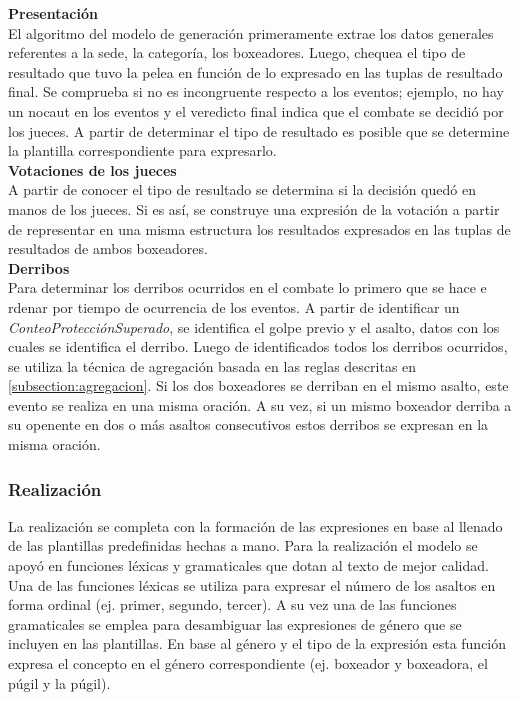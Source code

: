     \textbf{Presentación}\\

    El algoritmo del modelo de generación primeramente extrae los datos generales referentes a la sede, la categoría, los 
boxeadores. Luego, chequea el tipo de resultado que tuvo la pelea en función de lo expresado en las tuplas de resultado final.
Se comprueba si no es incongruente respecto a los eventos; ejemplo, no hay un nocaut en los eventos y el veredicto final indica que el 
combate se decidió por los jueces. A partir de determinar el tipo de resultado es posible que se determine la plantilla correspondiente para 
expresarlo.\\

    \textbf{Votaciones de los jueces}\\

    A partir de conocer el tipo de resultado se determina si la decisión quedó en manos de los jueces. Si es así, se construye una expresión 
de la votación a partir de representar en una misma estructura los resultados expresados en las tuplas de resultados de 
ambos boxeadores.\\

    \textbf{Derribos}\\

    Para determinar los derribos ocurridos en el combate lo primero que se hace e rdenar por tiempo de 
ocurrencia de los eventos. A partir de identificar un \textit{ConteoProtecciónSuperado}, se identifica el golpe previo y el asalto, 
datos con los cuales se identifica el derribo. Luego de identificados todos los derribos ocurridos, se utiliza la técnica de agregación 
basada en las reglas descritas en \ref{subsection:agregacion}. Si los dos boxeadores se derriban en el mismo asalto, este evento se realiza en 
una misma oración. A su vez, si un mismo boxeador derriba a su openente en dos o más asaltos consecutivos estos derribos se expresan en la misma 
oración.


\subsubsection{Realización}

    La realización se completa con la formación de las expresiones en base al llenado de las plantillas predefinidas hechas a mano. Para la 
realización el modelo se apoyó en funciones léxicas y gramaticales que dotan al texto de mejor calidad. Una de las funciones léxicas se utiliza 
para expresar el número de los asaltos en forma ordinal (ej. primer, segundo, tercer). A su vez una de las funciones gramaticales se emplea para
desambiguar las expresiones de género que se incluyen en las plantillas. En base al género y el tipo de la expresión esta función expresa el concepto 
en el género correspondiente (ej. boxeador y boxeadora, el púgil y la púgil). 

